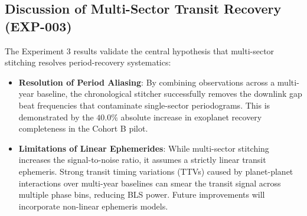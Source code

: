 \subsection{Discussion of Multi-Sector Transit Recovery (EXP-003)} \label{sec:disc_exp3}
The Experiment 3 results validate the central hypothesis that multi-sector stitching resolves period-recovery systematics:
\begin{itemize}
    \item \textbf{Resolution of Period Aliasing}: By combining observations across a multi-year baseline, the chronological stitcher successfully removes the downlink gap beat frequencies that contaminate single-sector periodograms. This is demonstrated by the $40.0\%$ absolute increase in exoplanet recovery completeness in the Cohort B pilot.
    \item \textbf{Limitations of Linear Ephemerides}: While multi-sector stitching increases the signal-to-noise ratio, it assumes a strictly linear transit ephemeris. Strong transit timing variations (TTVs) caused by planet-planet interactions over multi-year baselines can smear the transit signal across multiple phase bins, reducing BLS power. Future improvements will incorporate non-linear ephemeris models.
\end{itemize}

